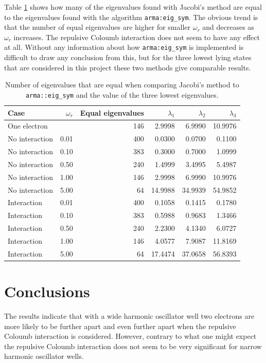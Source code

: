 \documentclass{article}
\begin{document}
Table \ref{tab:comp} shows how many of the eigenvalues found with Jacobi's method are equal to the eigenvalues found with the algorithm \texttt{arma:eig\_sym}. The obvious trend is that the number of equal eigenvalues are higher for smaller $\omega_r$ and decreases as $\omega_r$ increases. The repulsive Coloumb interaction does not seem to have any effect at all. Without any information about how \texttt{arma:eig\_sym} is implemented is difficult to draw any conclusion from this, but for the three lowest lying states that are considered in this project these two methods give comparable results.

\begin{table}[h]
\centering
\caption{Number of eigenvalues that are equal when comparing Jacobi's method to \texttt{arma::eig\_sym} and the value of the three lowest eigenvalues.}
\label{tab:comp}
\begin{tabularx}{\textwidth}{l r r r r r}
\hline
Case & $\omega_r$ & Equal eigenvalues & $\lambda_1$ & $\lambda_2$ & $\lambda_3$\\
\hline\hline
One electron   &      & 146 & 2.9998 & 6.9990 & 10.9976 \\
No interaction & 0.01 & 400 & 0.0300 & 0.0700 & 0.1100\\
No interaction & 0.10 & 383 & 0.3000 & 0.7000 & 1.0999\\
No interaction & 0.50 & 240 & 1.4999 & 3.4995 & 5.4987\\
No interaction & 1.00 & 146 & 2.9998 & 6.9990 & 10.9976\\
No interaction & 5.00 & 64  & 14.9988 & 34.9939 & 54.9852\\
Interaction    & 0.01 & 400 & 0.1058 & 0.1415 & 0.1780\\
Interaction    & 0.10 & 383 & 0.5988 & 0.9683 & 1.3466\\
Interaction    & 0.50 & 240 & 2.2300 & 4.1340 & 6.0727\\
Interaction    & 1.00 & 146 & 4.0577 & 7.9087 & 11.8169\\
Interaction    & 5.00 & 64  & 17.4474 & 37.0658 & 56.8393\\
\hline
\end{tabularx}
\end{table}

\section{Conclusions}
\label{sec:conclusions}

The results indicate that with a wide harmonic oscillator well two electrons are more likely to be further apart and even further apart when the repulsive Coloumb interaction is considered. However, contrary to what one might expect the repulsive Coloumb interaction does not seem to be very significant for narrow harmonic oscillator wells.
\end{document}
